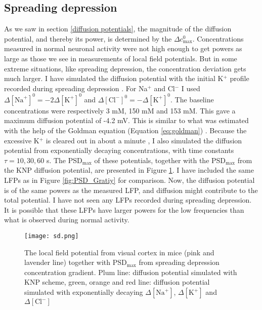 \documentclass{article}
\begin{document}
\subsection{Spreading depression}\label{SD simulated}

As we saw in section \ref{diffusion potentials}, the magnitude of the diffusion potential, and thereby its power, is determined by the $\Delta c_{\text{max}}^0$. Concentrations measured in normal neuronal activity were not high enough to get powers as large as those we see in measurements of local field potentials. But in some extreme situations, like spreading depression, the concentration deviation gets much larger. I have simulated the diffusion potential with the initial K$^+$ profile recorded during spreading depression \cite{Herreras1993}. For Na$^+$ and Cl$^-$ I used $\Delta [\text{Na}^+]^0 = -2\Delta [\text{K}^+]^0$ and $\Delta [\text{Cl}^-]^0 = -\Delta[\text{K}^+]^0$. The baseline concentrations were respectively 3 mM, 150 mM and 153 mM. This gave a maximum diffusion potential of -4.2 mV. This is similar to what was estimated with the help of the Goldman equation (Equation \ref{eq:goldman}) \cite{Herreras1993}. Because the excessive K$^+$ is cleared out in about a minute \cite{Ataya2015}, I also simulated the diffusion potential from exponentially decaying concentrations, with time constants $\tau = 10, 30, 60 $ s. The PSD$_{\text{max}}$ of these potentials, together with the PSD$_{\text{max}}$ from the KNP diffusion potential, are presented in Figure \ref{fig:sd}. I have included the same LFPs as in Figure \ref{fig:PSD_Gratiy} for comparison. 
Now, the diffusion potential is of the same powers as the measured  LFP, and diffusion might contribute to the total potential. I have not seen any LFPs recorded during spreading depression. It is possible that these LFPs have larger powers for the low frequencies than what is observed during normal activity. 

\begin{figure}
  \texttt{[image: sd.png]}
  \caption{The local field potential from visual cortex in mice (pink and lavender line) together with $\text{PSD}_{\text{max}}$ from spreading depression concentration gradient. Plum line: diffusion potential simulated with KNP scheme, green, orange and red line: diffusion potential simulated with exponentially decaying $\Delta [\text{Na}^+]$, $\Delta [\text{K}^+]$ and $\Delta [\text{Cl}^-]$}
  \label{fig:sd}
\end{figure}
\end{document}
